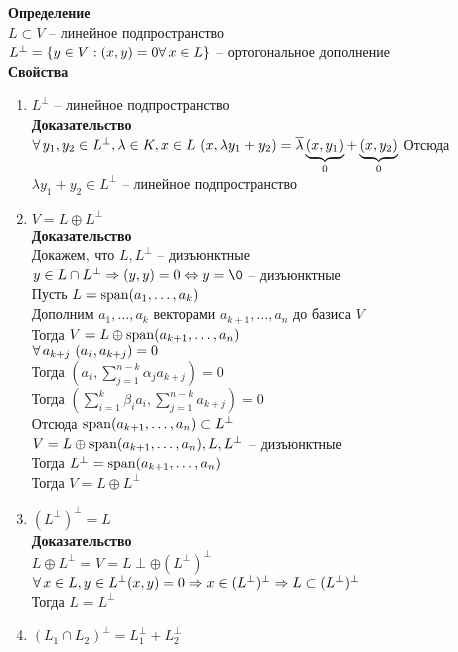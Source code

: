 \documentclass[12pt]{article}
\begin{document}
\textbf{Определение}\\
$L \subset V$ -- линейное подпространство\\
$L^\perp = \{y \in V: (x,y) = 0 \fall x \in L\}$ -- ортогональное дополнение\\
\textbf{Свойства}
\begin{enumerate}
    \item $L^\perp$ -- линейное подпространство\\
    \textbf{Доказательство}\\
    $\fall y_1, y_2 \in L^\perp, \lambda \in K, x \in L\ (x,\lambda y_1 + y_2) = \ol\lambda\ub{0}{(x,y_1)} + \ub{0}{(x, y_2)}$
    Отсюда $\lambda y_1 + y_2 \in L^\perp$ -- линейное подпространство
    \item $V = L \oplus L^\perp$\\
    \textbf{Доказательство}\\
    Докажем, что $L, L^\perp$ -- дизъюнктные\\
    $y \in L \cap L^\perp \Rto (y, y)=0 \LRto y = \0$ -- дизъюнктные\\
    Пусть $L = \span(a_1, \ldots, a_k)$\\
    Дополним $a_1,\ldots, a_k$ векторами $a_{k+1}, \ldots, a_n$ до базиса $V$\\
    Тогда $V = L \oplus \span(a_{k+1},\ldots, a_n)$\\
    $\fall a_{k+j}\ (a_i, a_{k+j}) = 0$\\
    Тогда $(a_i, \sum_{j=1}^{n-k} \alpha_j a_{k+j}) = 0$\\
    Тогда $(\sum_{i = 1}^k \beta_i a_i, \sum_{j=1}^{n-k} a_{k+j}) = 0$\\
    Отсюда $\span(a_{k+1}, \ldots, a_n) \subset L^\perp$\\
    $V = L \oplus \span(a_{k+1}, \ldots, a_n), L, L^\perp$ -- дизъюнктные\\
    Тогда $L^\perp = \span(a_{k+1},\ldots, a_n)$\\
    Тогда $V = L \oplus L^\perp$
    \item $(L^\perp)^\perp = L$\\
    \textbf{Доказательство}\\
    $L\oplus L^\perp = V = L\perp \oplus (L^\perp)^\perp$\\
    $\fall x \in L, y \in L^\perp (x, y) = 0 \Rto x \in (L^\perp)^\perp \Rto L \subset (L^\perp)^\perp$\\
    Тогда $L = L^\perp$
    \item $(L_1 \cap L_2)^\perp = L_1^\perp + L_2^\perp$\\

\end{enumerate}
\end{document}
